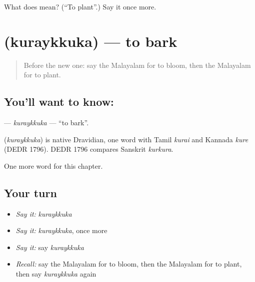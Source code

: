 \begin{tcolorbox}[breakable,colback=teal!4,colframe=teal!35!black,title={Before you move on}]
What does  mean? (\textquotedblleft{}To plant\textquotedblright{}.) Say it once more.
\end{tcolorbox}
\section[\texorpdfstring{\ml{കുരയ്ക്കുക} (kuraykkuka)}{കുരയ്ക്കുക (kuraykkuka)}]{ (kuraykkuka) — to bark}

\label{lesson:ML-C187-kuraykkuka}



\begin{quote}
Before the new one: say the Malayalam for to bloom, then the Malayalam for to plant.
\end{quote}

\subsection*{You'll want to know: }
\textbf{} — \emph{kuraykkuka} — \textquotedblleft{}to bark\textquotedblright{}.

\begin{cousinweb}
\textbf{} (\emph{kuraykkuka}) is native Dravidian, one word with Tamil \emph{kurai} and Kannada \emph{kure} (DEDR 1796). DEDR 1796 compares Sanskrit \emph{kurkura}.
\end{cousinweb}

\begin{grammarlens}[title={What you've built}]
One more word for this chapter.
\end{grammarlens}

\subsection*{Your turn}
\begin{itemize}
\raggedright
  \item \emph{Say it:} \emph{kuraykkuka}
  \item \emph{Say it:} \emph{kuraykkuka}, once more
  \item \emph{Say it:} say \emph{kuraykkuka}
  \item \emph{Recall:} say the Malayalam for to bloom, then the Malayalam for to plant, then say \emph{kuraykkuka} again
\end{itemize}

